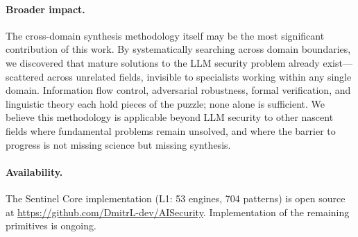 \paragraph{Broader impact.}
The cross-domain synthesis methodology itself may be the most significant
contribution of this work. By systematically searching across domain
boundaries, we discovered that mature solutions to the LLM security problem
already exist---scattered across unrelated fields, invisible to specialists
working within any single domain. Information flow control, adversarial
robustness, formal verification, and linguistic theory each hold pieces of the
puzzle; none alone is sufficient. We believe this methodology is applicable
beyond LLM security to other nascent fields where fundamental problems remain
unsolved, and where the barrier to progress is not missing science but missing
synthesis.

\paragraph{Availability.}
The Sentinel Core implementation (L1: 53 engines, 704 patterns) is open source
at \url{https://github.com/DmitrL-dev/AISecurity}. Implementation of the
remaining primitives is ongoing.
